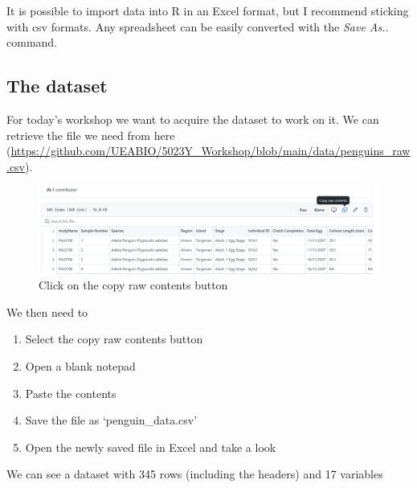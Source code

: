 \documentclass[
]{book}
\begin{document}
It is possible to import data into R in an Excel format, but I recommend sticking with csv formats. Any spreadsheet can be easily converted with the \emph{Save As..} command.

\hypertarget{the-dataset}{%
\subsection{The dataset}\label{the-dataset}}

For today's workshop we want to acquire the dataset to work on it. We can retrieve the file we need from here (\url{https://github.com/UEABIO/5023Y_Workshop/blob/main/data/penguins_raw.csv}).

\begin{figure}
\includegraphics[width=1\linewidth]{images/penguin_github} \caption{Click on the copy raw contents button}\label{fig:unnamed-chunk-46}
\end{figure}

We then need to

\begin{enumerate}
\def\labelenumi{\arabic{enumi}.}
\item
  Select the copy raw contents button
\item
  Open a blank notepad
\item
  Paste the contents
\item
  Save the file as `penguin\_data.csv'
\item
  Open the newly saved file in Excel and take a look
\end{enumerate}

We can see a dataset with 345 rows (including the headers) and 17 variables
\end{document}
